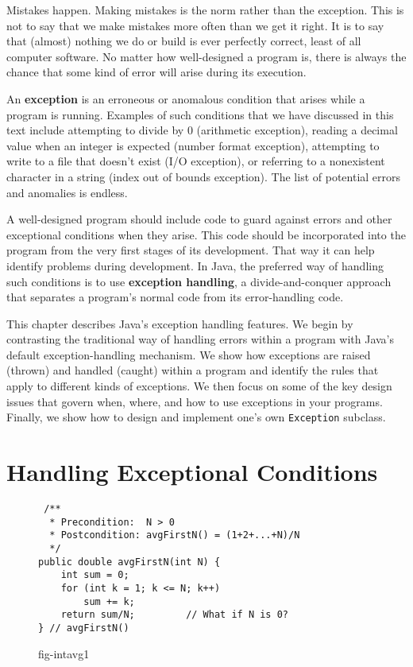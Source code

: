 \noindent Mistakes happen.  Making mistakes is the norm rather than the
exception.  This is not to say that we make mistakes more often than
we get it right.  It is to say that (almost) nothing we do or build is
ever perfectly correct, least of all computer software. No matter how
well-designed a program is, there is always the chance that some kind
of error will arise during its execution.

An {\bf exception} is an erroneous or anomalous
condition that arises  while a program is
running. Examples of such conditions that we have discussed in this
text include attempting to divide by 0 (arithmetic exception), reading
a decimal value when an integer is expected (number format exception),
attempting to write to a file that doesn't exist (I/O exception), or
referring to a nonexistent character in a string (index out of bounds
exception).  The list of potential errors and anomalies is endless.

A well-designed program should include code to guard against errors
and other exceptional conditions when they arise.  This code should be
incorporated into the program from the very first stages of its
development.  That way it can help identify problems during
development. In Java, the preferred way of handling such conditions is
to use {\bf exception handling}, a 
divide-and-conquer approach that separates a program's normal code 
from its error-handling code.


This chapter describes Java's exception handling features.  We begin
by contrasting the traditional way of handling errors within a program
with Java's default exception-handling mechanism.  We show how
exceptions are raised (thrown) and handled (caught) within a program
and identify the rules that apply to different kinds of exceptions.
We then focus on some of the key design issues that govern when,
where, and how to use exceptions in your programs.  Finally, we show
how to design and implement one's own {\tt Exception} subclass.

\section{Handling Exceptional Conditions}
\label{handling-exceptional-conditions}

\begin{figure}[b]
\jjjprogstart
\begin{jjjlisting}
\begin{lstlisting}
 /**
  * Precondition:  N > 0
  * Postcondition: avgFirstN() = (1+2+...+N)/N
  */
public double avgFirstN(int N) {
    int sum = 0;
    for (int k = 1; k <= N; k++)
        sum += k;
    return sum/N;         // What if N is 0?
} // avgFirstN()
\end{lstlisting}
\end{jjjlisting}
{fig-intavg1}
\end{figure}

